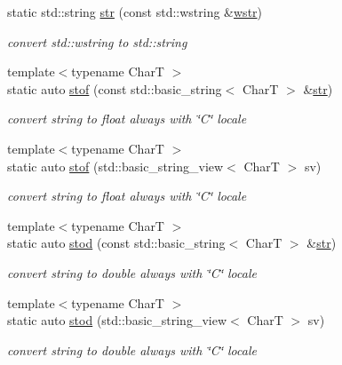 \begin{DoxyCompactItemize}
static std\+::string \hyperlink{structdevfix_1_1base_1_1strcvt_a469b02dcc803d1b740643d6809660851}{str} (const std\+::wstring \&\hyperlink{structdevfix_1_1base_1_1strcvt_a968c3adb34ac1ab9e687280ddc0742ff}{wstr})
\begin{DoxyCompactList}\small\item\em convert std\+::wstring to std\+::string \end{DoxyCompactList}\item 
{\footnotesize template$<$typename CharT $>$ }\\static auto \hyperlink{structdevfix_1_1base_1_1strcvt_a5b28d529cfbbf026c8e1550e92e2e557}{stof} (const std\+::basic\+\_\+string$<$ CharT $>$ \&\hyperlink{structdevfix_1_1base_1_1strcvt_a469b02dcc803d1b740643d6809660851}{str})
\begin{DoxyCompactList}\small\item\em convert string to float always with \char`\"{}\+C\char`\"{} locale \end{DoxyCompactList}\item 
{\footnotesize template$<$typename CharT $>$ }\\static auto \hyperlink{structdevfix_1_1base_1_1strcvt_ad124ced1e4a75974cdf8065985028265}{stof} (std\+::basic\+\_\+string\+\_\+view$<$ CharT $>$ sv)
\begin{DoxyCompactList}\small\item\em convert string to float always with \char`\"{}\+C\char`\"{} locale \end{DoxyCompactList}\item 
{\footnotesize template$<$typename CharT $>$ }\\static auto \hyperlink{structdevfix_1_1base_1_1strcvt_a63350be05c30f4cffee9d8dc8eed54d5}{stod} (const std\+::basic\+\_\+string$<$ CharT $>$ \&\hyperlink{structdevfix_1_1base_1_1strcvt_a469b02dcc803d1b740643d6809660851}{str})
\begin{DoxyCompactList}\small\item\em convert string to double always with \char`\"{}\+C\char`\"{} locale \end{DoxyCompactList}\item 
{\footnotesize template$<$typename CharT $>$ }\\static auto \hyperlink{structdevfix_1_1base_1_1strcvt_aec0faa61c87e1206ef3a50d5bb197fe7}{stod} (std\+::basic\+\_\+string\+\_\+view$<$ CharT $>$ sv)
\begin{DoxyCompactList}\small\item\em convert string to double always with \char`\"{}\+C\char`\"{} locale \end{DoxyCompactList}\item 

\end{DoxyCompactItemize}
